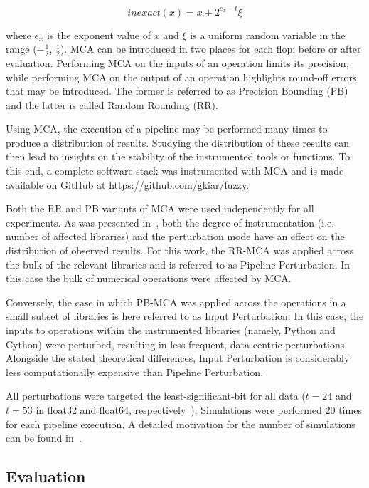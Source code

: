 \documentclass[fleqn,10pt]{SelfArx} %
\begin{document}
\begin{equation}
inexact(x) = x + 2^{e_x - t}\xi 
\label{eq:inexact}
\end{equation}

where $e_x$ is the exponent value of $x$ and $\xi$ is a uniform random variable in the range ($-\frac{1}{2}$,
$\frac{1}{2}$). MCA can be introduced in two places for each flop: before or after evaluation. Performing MCA on the
inputs of an operation limits its precision, while performing MCA on the output of an operation highlights round-off
errors that may be introduced. The former is referred to as Precision Bounding (PB) and the latter is called Random
Rounding (RR).

Using MCA, the execution of a pipeline may be performed many times to produce a distribution of results. Studying the
distribution of these results can then lead to insights on the stability of the instrumented tools or functions. To
this end, a complete software stack was instrumented with MCA and is made available on GitHub at
\url{https://github.com/gkiar/fuzzy}.

Both the RR and PB variants of MCA were used independently for all experiments. As was presented in~\cite{Kiar2020-lb},
both the degree of instrumentation (i.e. number of affected libraries) and the perturbation mode have an effect on the
distribution of observed results. For this work, the RR-MCA was applied across the bulk of the relevant libraries and
is referred to as Pipeline Perturbation. In this case the bulk of numerical operations were affected by MCA.

Conversely, the case in which PB-MCA was applied across the operations in a small subset of libraries is here referred
to as Input Perturbation. In this case, the inputs to operations within the instrumented libraries (namely, Python and
Cython) were perturbed, resulting in less frequent, data-centric perturbations. Alongside the stated theoretical
differences, Input Perturbation is considerably less computationally expensive than Pipeline Perturbation.

All perturbations were targeted the least-significant-bit for all data ($t=24$ and $t=53$ in float32 and float64,
respectively~\cite{Denis2016-wo}). Simulations were performed $20$ times for each pipeline execution. A detailed
motivation for the number of simulations can be found in~\cite{Sohier2018-ts}.

\subsection*{Evaluation}
\end{document}
